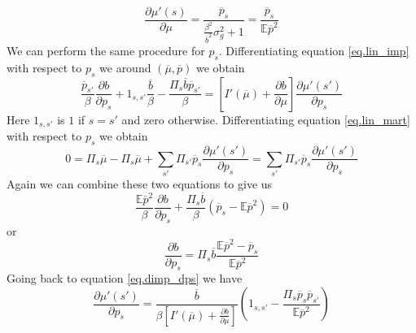 \documentclass[12pt]{article}
\newcommand{\EE}{\mathbb E}
\newcommand{\pbar}{{\overline p}}
\newcommand{\bbar}{{\overline b}}
\newcommand{\mubar}{{\overline \mu}}
\begin{document}
\begin{equation}
	\frac{\partial \mu'(s)}{\partial \mu} = \frac{\overline p_s}{\frac{\beta^2}{\overline b^2}\sigma^2_g +1} = \frac{\pbar_s}{\EE\pbar^2}
\end{equation}  We can perform the same procedure for $p_s$.  Differentiating equation \eqref{eq.lin_imp} with respect to $p_s$ we around $(\mubar,\pbar)$ we obtain
\begin{equation}\label{eq.dimp_dps}
\frac{\pbar_{s'}}{\beta}\frac{\partial b}{\partial p_s} + 1_{s,s'}\frac{\bbar}{\beta} - \frac{\Pi_s\bbar\pbar_{s'}}{\beta} = \left[I'(\mubar) + \frac{\partial b}{\partial \mu}\right]\frac{\partial \mu'(s')}{\partial p_s}
\end{equation} Here $1_{s,s'}$ is $1$ if $s = s'$ and zero otherwise.  Differentiating equation \eqref{eq.lin_mart} with respect to $p_s$ we obtain
\[
	0 = \Pi_s\mubar - \Pi_s\mubar + \sum_{s'} \Pi_{s'}\pbar_s\frac{\partial \mu'(s')}{\partial p_s} =  \sum_{s'} \Pi_{s'}\pbar_s\frac{\partial \mu'(s')}{\partial p_s}
\]  Again we can combine these two equations to give us
\[
	\frac{\EE\pbar^2}{\beta}\frac{\partial b}{\partial p_s} + \frac{\Pi_s\bbar}{\beta}(\pbar_s-\EE\pbar^2) = 0
\] or
\begin{equation}
	\frac{\partial b}{\partial p_s} = \Pi_s\bbar \frac{\EE\pbar^2-\pbar_s}{\EE\pbar^2}
\end{equation}Going back to equation \eqref{eq.dimp_dps} we have
\begin{equation}
	\frac{\partial \mu'(s')}{\partial p_s} = \frac{\bbar}{\beta\left[I '(\mubar) + \frac{\partial b}{\partial \mu}\right]}\left(1_{s,s'}-\frac{\Pi_s\pbar_s\pbar_{s'}}{\EE\pbar^2}\right)
\end{equation}
\end{document}
